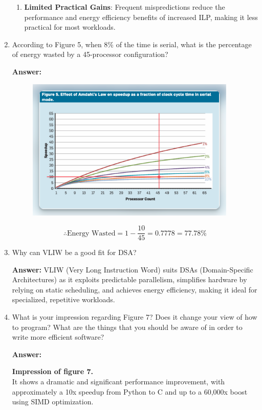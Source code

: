 \documentclass[a4paper,12pt]{article}
\begin{document}
\begin{enumerate}
\begin{enumerate}
        \item \textbf{Limited Practical Gains}: Frequent mispredictions reduce the performance and energy efficiency benefits of increased ILP, making it less practical for most workloads.
    \end{enumerate}

    \item According to Figure 5, when 8\% of the time is serial, what is the percentage of energy wasted by a 45-processor configuration?

    \textbf{Answer:}

    \begin{figure}[h]
        \includegraphics[width=10cm]{fig5.png}
        \centering
    \end{figure}

    \[
    \therefore \text{Energy Wasted} = 1 - \frac{10}{45} = 0.7778 = 77.78\%
    \]

    \item Why can VLIW be a good fit for DSA?

    \textbf{Answer:}
    VLIW (Very Long Instruction Word) suits DSAs (Domain-Specific Architectures) as it exploits predictable parallelism, simplifies hardware by relying on static scheduling, and achieves energy efficiency, making it ideal for specialized, repetitive workloads.

    \newpage

    \item What is your impression regarding Figure 7? Does it change your view of how to program? What are the things that you should be aware of in order to write more efficient software?

    \textbf{Answer:}

    \textbf{Impression of figure 7.}\\
    It shows a dramatic and significant performance improvement, with approximately a 10x speedup from Python to C and up to a 60,000x boost using SIMD optimization.


\end{enumerate}
\end{document}
